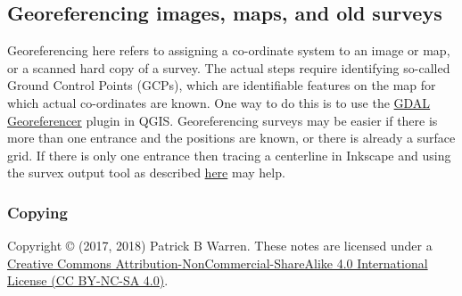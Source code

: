 \documentclass[]{article}
\begin{document}
\subsection{Georeferencing images, maps, and old
surveys}\label{georeferencing-images-maps-and-old-surveys}

Georeferencing here refers to assigning a co-ordinate system to an image
or map, or a scanned hard copy of a survey. The actual steps require
identifying so-called Ground Control Points (GCPs), which are
identifiable features on the map for which actual co-ordinates are
known. One way to do this is to use the
\href{https://docs.qgis.org/2.8/en/docs/user_manual/plugins/plugins_georeferencer.html}{GDAL
Georeferencer} plugin in QGIS.
Georeferencing surveys may be easier if there is more than one entrance
and the positions are known, or there is already a surface grid. If
there is only one entrance then tracing a centerline in Inkscape and
using the survex output tool as described
\href{https://github.com/patrickbwarren/inkscape-survex-export}{here}
may help.

\subsubsection{Copying}\label{copying}

Copyright © (2017, 2018) Patrick B Warren.
These notes are licensed under a
\href{https://creativecommons.org/licenses/by-nc-sa/4.0/}{Creative
  Commons Attribution-NonCommercial-ShareAlike 4.0 International
  License (CC BY-NC-SA 4.0)}.
\end{document}
